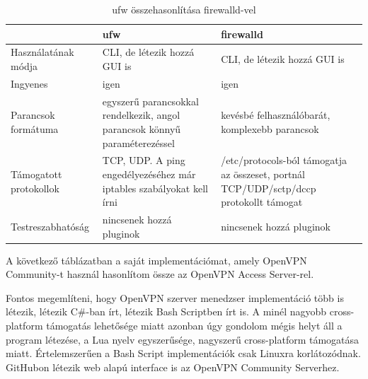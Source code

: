 \begin{table}[h]
\centering
\caption{ufw összehasonlítása firewalld-vel}
\label{tab:ispconfig}
\begin{tabularx}{\linewidth}{l|L|L}
 & ufw & firewalld \\
\hline
Használatának módja & CLI, de létezik hozzá GUI is & CLI, de létezik hozzá GUI is \\
\hline
Ingyenes & igen & igen \\
\hline
Parancsok formátuma & egyszerű parancsokkal rendelkezik, angol parancsok könnyű paraméterezéssel \cite{ufw} & kevésbé felhasználóbarát, komplexebb parancsok \cite{firewalld_man}\\
\hline
Támogatott protokollok & TCP, UDP. A ping engedélyezéséhez már iptables szabályokat kell írni & /etc/protocols-ból támogatja az összeset, portnál TCP/UDP/sctp/dccp protokollt támogat \\
\hline
Testreszabhatóság & nincsenek hozzá pluginok & nincsenek hozzá pluginok \\
\end{tabularx}
\end{table}

\pagebreak

A következő táblázatban a saját implementációmat, amely OpenVPN Community-t használ hasonlítom össze az OpenVPN Access Server-rel.

Fontos megemlíteni, hogy OpenVPN szerver menedzser implementáció több is létezik, létezik C\#-ban írt, létezik Bash Scriptben írt is. A minél nagyobb cross-platform támogatás lehetősége miatt azonban úgy gondolom mégis helyt áll a program létezése, a Lua nyelv egyszerűsége, nagyszerű cross-platform támogatása miatt. Értelemszerűen a Bash Script implementációk csak Linuxra korlátozódnak. GitHubon létezik web alapú interface is az OpenVPN Community Serverhez.


